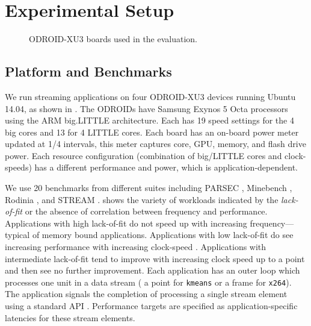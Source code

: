 \section{Experimental Setup}
\begin{figure}[t]
 \caption{ODROID-XU3 boards used in the evaluation.}
 \label{fig:odroidall}
\end{figure}

\subsection{Platform and Benchmarks}
We run streaming applications on four ODROID-XU3 devices running
Ubuntu 14.04, as shown in . The ODROIDs have
Samsung Exynos 5 Octa processors using the ARM big.LITTLE
architecture.  Each has 19 speed settings for the 4 big cores and 13
for 4 LITTLE cores.  Each board has an on-board power meter updated at
1/4 \ms intervals, this meter captures core, GPU, memory, and flash
drive power.  Each resource configuration (combination of big/LITTLE
cores and clock-speeds) has a different performance and power, which
is application-dependent.

We use 20 benchmarks from different suites including PARSEC
\cite{parsec}, Minebench \cite{minebench}, Rodinia \cite{rodinia}, and
STREAM \cite{stream}.  shows the
variety of workloads indicated by the \emph{lack-of-fit} or the
absence of correlation between frequency and performance.
Applications with high lack-of-fit do not speed up with increasing
frequency---typical of memory bound applications. Applications with
low lack-of-fit do see increasing performance with increasing
clock-speed \cite{powerslope}.  Applications with intermediate
lack-of-fit tend to improve with increasing clock speed up to a point
and then see no further improvement.  Each application has an outer
loop which processes one unit in a data stream (\eg{} a point for
\texttt{kmeans} or a frame for \texttt{x264}). The application signals
the completion of processing a single stream element using a standard
API \cite{icac2010heartbeats}.  Performance targets are specified as
application-specific latencies for these stream elements.



